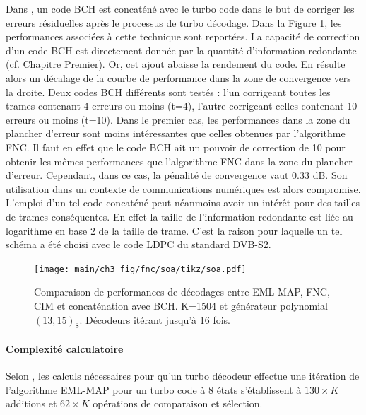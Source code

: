 Dans \cite{andersenBCH}, un code BCH est concaténé avec le turbo code dans le but de corriger les erreurs résiduelles 
après le processus de turbo décodage. Dans la Figure \ref{fig:fnc_soa}, les performances associées à cette technique sont
reportées. La capacité de 
correction d'un code BCH est directement donnée par la quantité d'information redondante (cf. Chapitre Premier). Or, cet 
ajout abaisse la rendement du code. En résulte alors un décalage de la courbe de performance dans la zone de convergence 
vers la droite. Deux codes BCH différents sont testés : l'un corrigeant toutes les trames contenant 4 erreurs ou moins (t=4), l'autre 
corrigeant celles contenant 10 erreurs ou moins (t=10). Dans le premier cas, les performances dans la zone du plancher 
d'erreur sont moins intéressantes que celles obtenues par l'algorithme FNC. Il faut en effet que le code BCH ait un pouvoir
de correction de 10 pour obtenir les mêmes performances que l'algorithme FNC dans la zone du plancher d'erreur. Cependant, 
dans ce cas, la pénalité de convergence vaut 0.33 dB. Son utilisation dans un contexte de communications numériques 
est alors compromise. L'emploi d'un tel code concaténé peut néanmoins avoir un intérêt pour des tailles de trames
conséquentes. En effet la taille de l'information redondante est liée au logarithme en base 2 de la taille de trame.
C'est la raison pour laquelle un tel schéma a été choisi avec le code LDPC du standard DVB-S2.

\begin{figure}[!htb]
	\centering
	\texttt{[image: main/ch3\_fig/fnc/soa/tikz/soa.pdf]}
	\caption{Comparaison de performances de décodages entre EML-MAP, FNC, CIM et concaténation avec BCH. K=1504 et générateur
	polynomial $(13,15)_8$.	Décodeurs itérant jusqu'à 16 fois. \label{fig:fnc_soa}}
\end{figure}

\paragraph*{Complexité calculatoire} Selon \cite{david_gnaedig_thesis}, les calculs nécessaires pour qu'un turbo décodeur 
effectue une itération de l'algorithme EML-MAP pour un turbo code à 8 états s'établissent à $130\times K$ additions 
et $62\times K$ opérations de comparaison et sélection.

